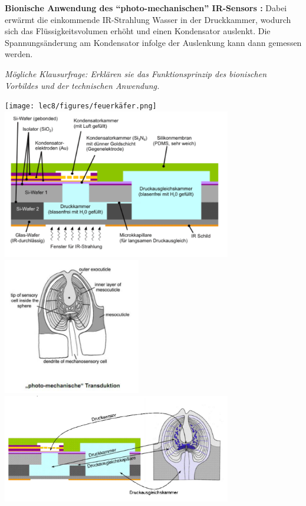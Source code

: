 \textbf{Bionische Anwendung des ``photo-mechanischen'' IR-Sensors \dangersign:} Dabei erwärmt die einkommende IR-Strahlung Wasser in der Druckkammer, wodurch sich das Flüssigkeitsvolumen erhöht und einen Kondensator auslenkt. Die Spannungsänderung am Kondensator infolge der Auslenkung kann dann gemessen werden. 

\textit{Mögliche Klausurfrage: Erklären sie das Funktionsprinzip des bionischen Vorbildes und der technischen Anwendung.} 

\begin{center}
    \texttt{[image: lec8/figures/feuerkäfer.png]}
    \hfill
    \includegraphics[width=10cm]{lec8/figures/photo-mechanisch-bionisch.png}
    \\
    \includegraphics[width=6cm]{lec8/figures/photo-mechanisch.png}
    \hfill
    \includegraphics[width=10cm]{lec8/figures/photo-mechanisch-bionisch-2.png}
\end{center}

